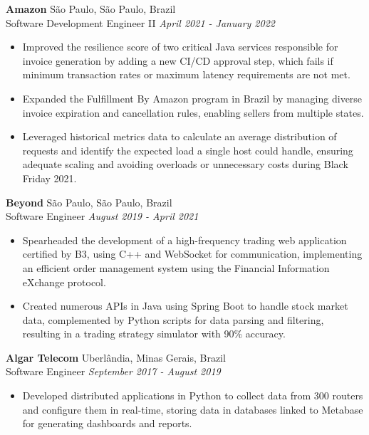 \documentclass[a4paper,10pt]{article}
\begin{document}
\textbf{Amazon} \hfill São Paulo, São Paulo, Brazil \\
Software Development Engineer II \hfill \textit{April 2021 - January 2022}
\begin{itemize}
    \item Improved the resilience score of two critical Java services responsible for invoice generation by adding a new CI/CD approval step, which fails if minimum transaction rates or maximum latency requirements are not met.
    \item Expanded the Fulfillment By Amazon program in Brazil by managing diverse invoice expiration and cancellation rules, enabling sellers from multiple states.
    \item Leveraged historical metrics data to calculate an average distribution of requests and identify the expected load a single host could handle, ensuring adequate scaling and avoiding overloads or unnecessary costs during Black Friday 2021.
\end{itemize}

\textbf{Beyond} \hfill São Paulo, São Paulo, Brazil \\
Software Engineer \hfill \textit{August 2019 - April 2021}
\begin{itemize}
    \item Spearheaded the development of a high-frequency trading web application certified by B3, using C++ and WebSocket for communication, implementing an efficient order management system using the Financial Information eXchange protocol.
    \item Created numerous APIs in Java using Spring Boot to handle stock market data, complemented by Python scripts for data parsing and filtering, resulting in a trading strategy simulator with 90\% accuracy.
\end{itemize}

\textbf{Algar Telecom} \hfill Uberlândia, Minas Gerais, Brazil \\
Software Engineer \hfill \textit{September 2017 - August 2019}
\begin{itemize}
    \item Developed distributed applications in Python to collect data from 300 routers and configure them in real-time, storing data in databases linked to Metabase for generating dashboards and reports.
\end{itemize}

\end{document}
